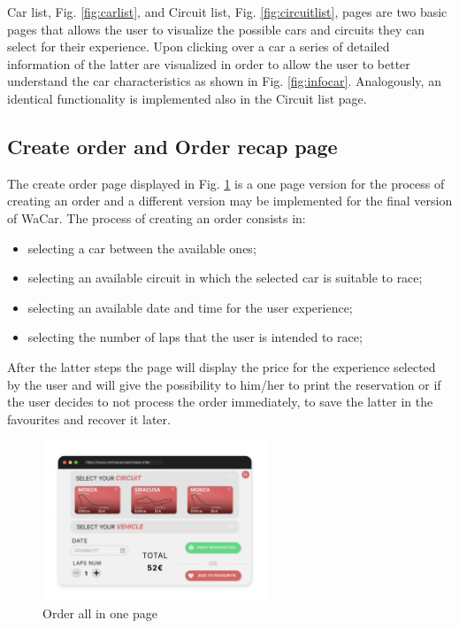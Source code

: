 Car list, Fig. \ref{fig:carlist}, and Circuit list, Fig. \ref{fig:circuitlist}, pages are two basic pages that allows the user to visualize the possible cars and circuits they can select for their experience. Upon clicking over a car a series of detailed information of the latter are visualized in order to allow the user to better understand the car characteristics as shown in Fig. \ref{fig:infocar}. Analogously, an identical functionality is implemented also in the Circuit list page.

\subsection{Create order and Order recap page}

The create order page displayed in Fig. \ref{fig:allinone} is a one page version for the process of creating an order and a different version may be implemented for the final version of WaCar. The process of creating an order consists in:

\begin{itemize}
    \item selecting a car between the available ones;
    \item selecting an available circuit in which the selected car is suitable to race;
    \item selecting an available date and time for the user experience;
    \item selecting the number of laps that the user is intended to race;
\end{itemize}

After the latter steps the page will display the price for the experience selected by the user and will give the possibility to him/her to print the reservation or if the user decides to not process the order immediately, to save the latter in the favourites and recover it later.

\begin{figure}[h]
    \centering
    \includegraphics[width=0.6\textwidth]{mockup/OrderAllInOne.png}
    \caption{Order all in one page}
    \label{fig:allinone}
\end{figure}